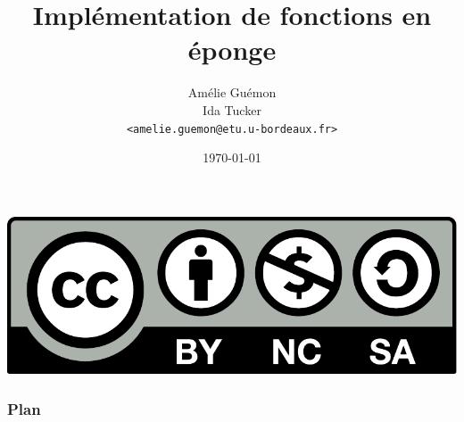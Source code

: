 %
%

\usepackage[french]{babel}
\usepackage{tikz}
\usetikzlibrary{shapes}
\usetikzlibrary{positioning}
\usepackage{color}

\newcommand{\highlight}[1]{\textcolor{structure.fg}{\bfseries #1}}

\title{Implémentation de fonctions en éponge}

\author[Amélie Guémon\\Ida Tucker]{Amélie Guémon\\Ida Tucker\\[-.25em]
\texttt{\scriptsize <amelie.guemon@etu.u-bordeaux.fr>}\\}


\date{\today}



\begin{frame}
  \vspace{3.5em}
  \titlepage

  \begin{center}
    \includegraphics[scale=.2]{cc-by-nc-sa.pdf}
  \end{center}
\end{frame}

\begin{frame}
  \frametitle{Plan}
  \tableofcontents[subsectionstyle=hide]
\end{frame}



